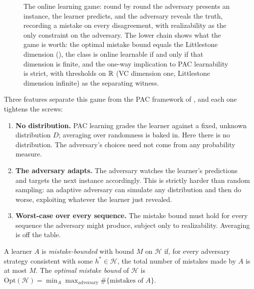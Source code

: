 \begin{figure}[ht]
\caption[The online learning game, whose value is the Littlestone dimension]{The online learning game: round by round the adversary presents an instance, the learner predicts, and the adversary reveals the truth, recording a mistake on every disagreement, with realizability as the only constraint on the adversary. The lower chain shows what the game is worth: the optimal mistake bound equals the Littlestone dimension (), the class is online learnable if and only if that dimension is finite, and the one-way implication to PAC learnability is strict, with thresholds on $\mathbb{R}$ (VC dimension one, Littlestone dimension infinite) as the separating witness.}
\label{fig:online-protocol}
\end{figure}

Three features separate this game from the PAC framework of , and each one tightens the screws:

\begin{enumerate}[leftmargin=*, itemsep=3pt]
\item \textbf{No distribution.} PAC learning grades the learner against a fixed, unknown distribution $D$; averaging over randomness is baked in. Here there is no distribution. The adversary's choices need not come from any probability measure.

\item \textbf{The adversary adapts.} The adversary watches the learner's predictions and targets the next instance accordingly. This is strictly harder than random sampling: an adaptive adversary can simulate any distribution and then do worse, exploiting whatever the learner just revealed.

\item \textbf{Worst-case over every sequence.} The mistake bound must hold for every sequence the adversary might produce, subject only to realizability. Averaging is off the table.
\end{enumerate}

\begin{defn}
\label{def:mistake-bound}
A learner $A$ is \emph{mistake-bounded} with bound $M$ on $\mathcal{H}$ if, for every adversary strategy consistent with some $h^* \in \mathcal{H}$, the total number of mistakes made by $A$ is at most $M$. The \emph{optimal mistake bound} of $\mathcal{H}$ is $\mathrm{Opt}(\mathcal{H}) = \min_A \max_{\mathrm{adversary}} \#\{\text{mistakes of } A\}$.
\end{defn}


